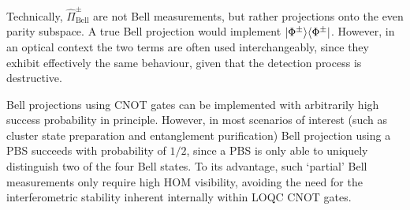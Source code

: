 Technically, $\hat\Pi^\pm_\mathrm{Bell}$ are not Bell measurements, but rather projections onto the even parity subspace. A true Bell projection would implement $|\Phi^\pm\rangle\langle\Phi^\pm|$. However, in an optical context the two terms are often used interchangeably, since they exhibit effectively the same behaviour, given that the detection process is destructive.

Bell projections using CNOT gates can be implemented with arbitrarily high success probability in principle. However, in most scenarios of interest (such as cluster state preparation and entanglement purification) Bell projection using a PBS succeeds with probability of $1/2$, since a PBS is only able to uniquely distinguish two of the four Bell states. To its advantage, such `partial' Bell measurements only require high HOM visibility, avoiding the need for the interferometric stability inherent internally within LOQC CNOT gates.

